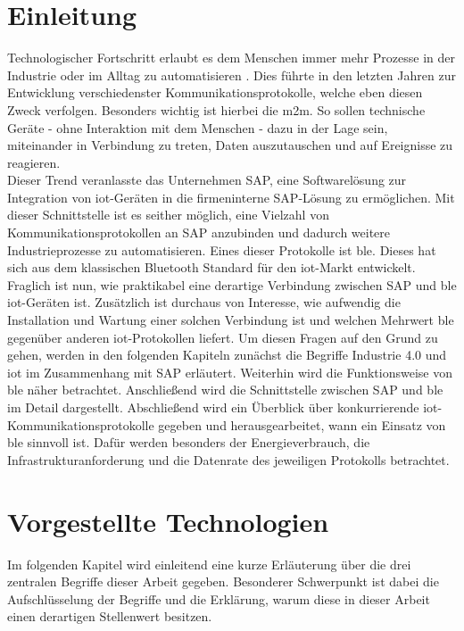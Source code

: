 \section{Einleitung}
\label{s:intro}

\noindent Technologischer Fortschritt erlaubt es dem Menschen immer mehr Prozesse in der Industrie oder im Alltag zu automatisieren \cite{IAM18:WWW}. Dies führte in den letzten Jahren zur Entwicklung verschiedenster Kommunikationsprotokolle, welche eben diesen Zweck verfolgen. Besonders wichtig ist hierbei die \ac{m2m}. So sollen technische Geräte - ohne Interaktion mit dem Menschen - dazu in der Lage sein, miteinander in Verbindung zu treten, Daten auszutauschen und auf Ereignisse zu reagieren.\\
\noindent Dieser Trend veranlasste das Unternehmen SAP, eine Softwarelösung zur Integration von \ac{iot}-Geräten in die firmeninterne SAP-Lösung zu ermöglichen. Mit dieser Schnittstelle ist es seither möglich, eine Vielzahl von Kommunikationsprotokollen an SAP anzubinden und dadurch weitere Industrieprozesse zu automatisieren. Eines dieser Protokolle ist \ac{ble}. Dieses hat sich aus dem klassischen Bluetooth Standard für den \ac{iot}-Markt entwickelt.\\
\noindent Fraglich ist nun, wie praktikabel eine derartige Verbindung zwischen SAP und \ac{ble} \ac{iot}-Geräten ist. Zusätzlich ist durchaus von Interesse, wie aufwendig die Installation und Wartung einer solchen Verbindung ist und welchen Mehrwert \ac{ble} gegenüber anderen \ac{iot}-Protokollen liefert. Um diesen Fragen auf den Grund zu gehen, werden in den folgenden Kapiteln zunächst die Begriffe Industrie 4.0 und \ac{iot} im Zusammenhang mit SAP erläutert. Weiterhin wird die Funktionsweise von \ac{ble} näher betrachtet. Anschließend wird die Schnittstelle zwischen SAP und \ac{ble} im Detail dargestellt. Abschließend wird ein Überblick über konkurrierende \ac{iot}-Kommunikationsprotokolle gegeben und herausgearbeitet, wann ein Einsatz von \ac{ble} sinnvoll ist. Dafür werden besonders der Energieverbrauch, die Infrastrukturanforderung und die Datenrate des jeweiligen Protokolls betrachtet.\\     

\section{Vorgestellte Technologien}
\label{s:grundlagen}

\noindent Im folgenden Kapitel wird einleitend eine kurze Erläuterung über die drei zentralen Begriffe dieser Arbeit gegeben. Besonderer Schwerpunkt ist dabei die Aufschlüsselung der Begriffe und die Erklärung, warum diese in dieser Arbeit einen derartigen Stellenwert besitzen.\\ 

